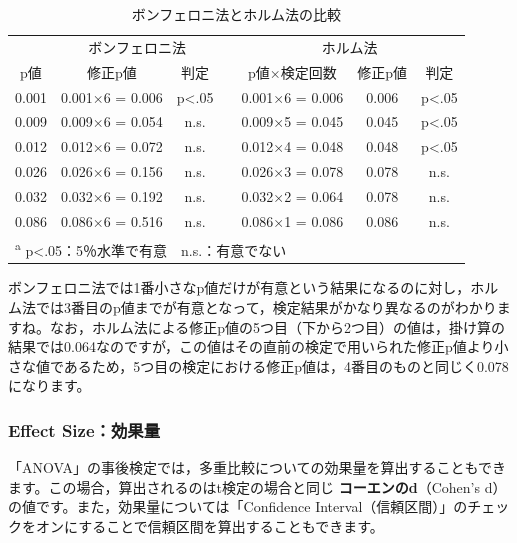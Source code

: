 \documentclass[
  12pt,
  a5jpaper,
  lualatex, ja=standard]{bxjsbook}
\renewcommand{\emph}[1]{\textbf{\color{emph} #1}}
\begin{document}
\begin{table}[H]

\caption{\label{tab:ANOVA-anova-posthoc-compare}ボンフェロニ法とホルム法の比較}
\centering
\begin{tabular}[t]{ccccccc}
\toprule
\multicolumn{1}{c}{ } & \multicolumn{2}{c}{ボンフェロニ法} & \multicolumn{1}{c}{ } & \multicolumn{3}{c}{ホルム法} \\
\cmidrule(l{3pt}r{3pt}){2-3} \cmidrule(l{3pt}r{3pt}){5-7}
p値 & 修正p値 & 判定 &   & p値×検定回数 & 修正p値 & 判定\\
\midrule
0.001 & 0.001×6 = 0.006 & p<.05 &  & 0.001×6 = 0.006 & 0.006 & p<.05\\
0.009 & 0.009×6 = 0.054 & n.s. &  & 0.009×5 = 0.045 & 0.045 & p<.05\\
0.012 & 0.012×6 = 0.072 & n.s. &  & 0.012×4 = 0.048 & 0.048 & p<.05\\
0.026 & 0.026×6 = 0.156 & n.s. &  & 0.026×3 = 0.078 & 0.078 & n.s.\\
0.032 & 0.032×6 = 0.192 & n.s. &  & 0.032×2 = 0.064 & 0.078 & n.s.\\
0.086 & 0.086×6 = 0.516 & n.s. &  & 0.086×1 = 0.086 & 0.086 & n.s.\\
\bottomrule
\multicolumn{7}{l}{\textsuperscript{a} p<.05：5％水準で有意　n.s.：有意でない}\\
\end{tabular}
\end{table}

ボンフェロニ法では1番小さなp値だけが有意という結果になるのに対し，ホルム法では3番目のp値までが有意となって，検定結果がかなり異なるのがわかりますね。なお，ホルム法による修正p値の5つ目（下から2つ目）の値は，掛け算の結果では0.064なのですが，この値はその直前の検定で用いられた修正p値より小さな値であるため，5つ目の検定における修正p値は，4番目のものと同じく0.078になります。

\hypertarget{effect-sizeux52b9ux679cux91cf-2}{%
\subsubsection*{Effect Size：効果量}\label{effect-sizeux52b9ux679cux91cf-2}}

「ANOVA」の事後検定では，多重比較についての効果量を算出することもできます。この場合，算出されるのはt検定の場合と同じ\emph{コーエンのd}（Cohen's d）の値です。また，効果量については「Confidence Interval（信頼区間）」のチェックをオンにすることで信頼区間を算出することもできます。
\end{document}
